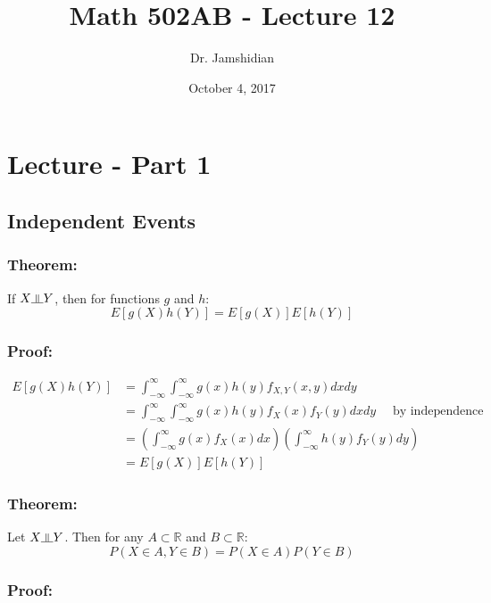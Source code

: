 \documentclass{article}
\title{Math 502AB - Lecture 12}
\author{Dr. Jamshidian}
\date{October 4, 2017}
\newcommand{\indep}{\rotatebox[origin=c]{90}{$\models$}}
\begin{document}
\maketitle

\section{Lecture - Part 1}

\subsection{Independent Events}

\subsubsection{Theorem:}

If $X \indep Y$, then for functions $g$ and $h$:
\begin{equation*}
    E[g(X)h(Y)] = E[g(X)]E[h(Y)]
\end{equation*}

\subsubsection*{Proof:}
\begin{equation*}
    \begin{split}
        E[g(X)h(Y)] &= \int_{-\infty}^\infty \int_{-\infty}^\infty g(x) h(y) f_{X,Y}(x,y)dxdy\\
        &= \int_{-\infty}^\infty \int_{-\infty}^\infty g(x) h(y) f_X(x) f_Y(y) dx dy \quad \text{ by independence}\\
        &= \left(\int_{-\infty}^\infty g(x) f_X(x) dx\right) \left( \int_{-\infty}^\infty h(y) f_Y(y) dy\right)\\
        &= E[g(X)]E[h(Y)]
    \end{split}
\end{equation*}

\subsubsection{Theorem:}

Let $X \indep Y$. Then for any $A \subset \mathbb{R}$ and $B \subset \mathbb{R}$:
\begin{equation*}
    P(X \in A, Y \in B) = P(X \in A) P(Y \in B)
\end{equation*}

\subsubsection*{Proof:}
\end{document}
